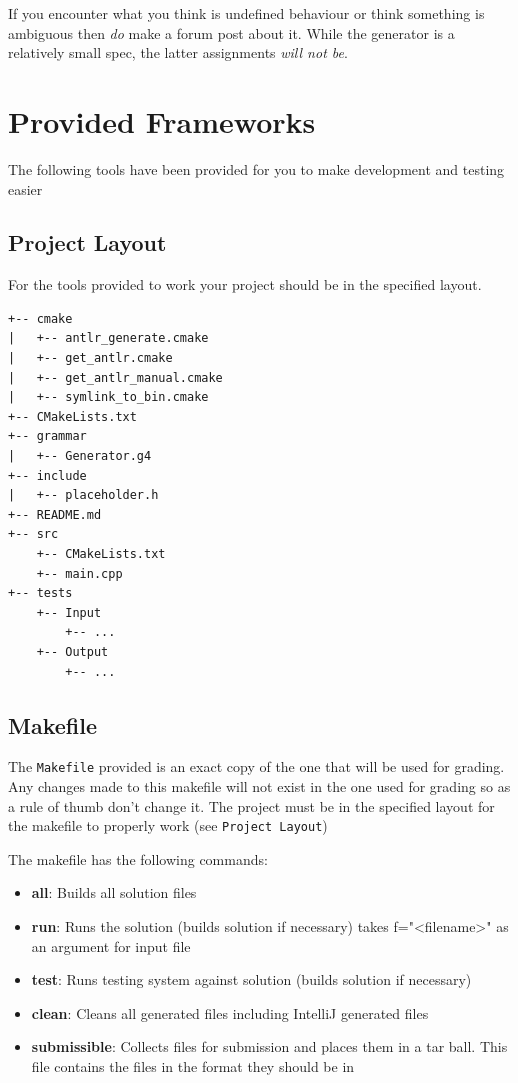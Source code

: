 \documentclass{article}
\begin{document}
If you encounter what you think is undefined behaviour or think something is ambiguous then
\textit{do} make a forum post about it. While the generator is a relatively small spec,
the latter assignments \textit{will not be}.

\section{Provided Frameworks}

The following tools have been provided for you to make development and testing easier

\subsection{Project Layout}
For the tools provided to work your project should be in the specified layout.

\begin{lstlisting}
+-- cmake
|   +-- antlr_generate.cmake
|   +-- get_antlr.cmake
|   +-- get_antlr_manual.cmake
|   +-- symlink_to_bin.cmake
+-- CMakeLists.txt
+-- grammar
|   +-- Generator.g4
+-- include
|   +-- placeholder.h
+-- README.md
+-- src
    +-- CMakeLists.txt
    +-- main.cpp
+-- tests
    +-- Input
        +-- ...
    +-- Output
        +-- ...
\end{lstlisting}


\subsection{Makefile}
The \texttt{Makefile} provided is an exact copy of the one that will be used for grading.  Any changes made to
this makefile will not exist in the one used for grading so as a rule of thumb don't change it. The project must
be in the specified layout for the makefile to properly work (see \texttt{Project Layout})

The makefile has the following commands:
\begin{itemize}
  \item{\textbf{all}}: Builds all solution files
  \item{\textbf{run}}: Runs the solution (builds solution if necessary) takes f="<filename>" as an argument for
    input file
  \item{\textbf{test}}: Runs testing system against solution (builds solution if necessary)
  \item{\textbf{clean}}: Cleans all generated files including IntelliJ generated files
  \item{\textbf{submissible}}: Collects files for submission and places them in a tar ball. This file contains
  the files in the format they should be in
\end{itemize}
\end{document}
